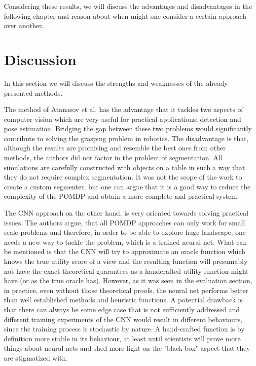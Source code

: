 \documentclass[a4paper,11pt,english]{article}
\begin{document}
Considering these results, we will discuss the advantages and disadvantages in the following chapter and reason about when might one consider a certain approach over another.

\section{Discussion} %

In this section we will discuss the strengths and weaknesses of the already presented methods.

The method of Atanasov et al. \cite{atanasov2014nonmyopic} has the advantage that it tackles two aspects of computer vision which are very useful for practical applications: detection and pose estimation. Bridging the gap between these two problems would significantly contribute to solving the grasping problem in robotics. The disadvantage is that, although the results are promising and resemble the best ones from other methods, the authors did not factor in the problem of segmentation. All simulations are carefully constructed with objects on a table in such a way that they do not require complex segmentation. It was not the scope of the work to create a custom segmenter, but one can argue that it is a good way to reduce the complexity of the POMDP and obtain a more complete and practical system.

The CNN approach on the other hand, is very oriented towards solving practical issues. The authors argue, that all POMDP approaches can only work for small scale problems and therefore, in order to be able to explore huge landscape, one needs a new way to tackle the problem, which is a trained neural net. What can be mentioned is that the CNN will try to approximate an oracle function which knows the true utility score of a view and the resulting function will presumably not have the exact theoretical guarantees as a handcrafted utility function might have (or as the true oracle has). However, as it was seen in the evaluation section, in practice, even without those theoretical proofs, the neural net performs better than well established methods and heuristic functions. A potential drawback is that there can always be some edge case that is not sufficiently addressed and different training experiments of the CNN would result in different behaviours, since the training process is stochastic by nature. A hand-crafted function is by definition more stable in its behaviour, at least until scientists will prove more things about neural nets and shed more light on the "black box" aspect that they are stigmatized with.
\end{document}

